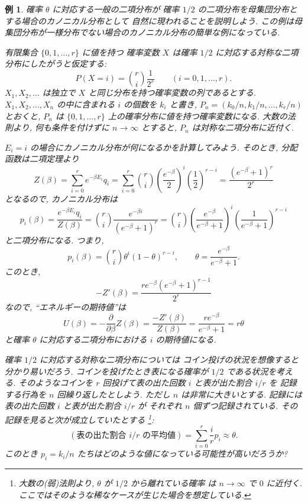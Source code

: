 \documentclass[12pt,twoside]{jarticle}
\renewcommand\d{\partial}
\theoremstyle{jplain}
\newtheorem{example}[theorem]{例}
\theoremstyle{jplain}
\theoremstyle{jplain}
\numberwithin{theorem}{section}
\numberwithin{equation}{section}
\numberwithin{figure}{section}
\numberwithin{table}{section}
\begin{document}
\begin{example}
\label{example:binom-Gibbs}
確率 $\theta$ に対応する一般の二項分布が
確率 $1/2$ の二項分布を母集団分布とする場合のカノニカル分布として
自然に現われることを説明しよう.
この例は母集団分布が一様分布でない場合のカノニカル分布の簡単な例になっている.

有限集合 $\{0,1,\ldots,r\}$ に値を持つ
確率変数 $X$ は確率 $1/2$ に対応する対称な二項分布にしたがうと仮定する:
\[
P(X=i)=\binom{r}{i}\frac{1}{2^r}
\qquad (i=0,1,\ldots,r).
\]
$X_1,X_2,\ldots$ は独立で $X$ と同じ分布を持つ確率変数の列であるとする.
$X_1,X_2,\ldots,X_n$ の中に含まれる $i$ の個数を $k_i$ と書き,
$P_n=(k_0/n,k_1/n,\ldots,k_r/n)$ とおくと,
$P_n$ は $\{0,1,\ldots,r\}$ 上の確率分布に値を持つ確率変数になる.
大数の法則より, 何も条件を付けずに $n\to\infty$ とすると,
$P_n$ は対称な二項分布に近付く.

$E_i=i$ の場合にカノニカル分布が何になるかを計算してみよう.
そのとき, 分配函数は二項定理より
\[
Z(\beta)
=\sum_{i=0}^r e^{-\beta E_i}q_i
=\sum_{i=0}^r \binom{r}{i}\left(\frac{e^{-\beta}}{2}\right)^i\left(\frac{1}{2}\right)^{r-i}
=\frac{(e^{-\beta}+1)^r}{2^r}
\]
となるので, カノニカル分布は
\[
p_i(\beta)
=\frac{e^{-\beta E_i}q_i}{Z(\beta)}
=\binom{r}{i}\frac{e^{-\beta i}}{(e^{-\beta}+1)^r}
=\binom{r}{i}
\left(\frac{e^{-\beta}}{e^{-\beta}+1}\right)^i
\left(\frac{1}{e^{-\beta}+1}\right)^{r-i}
\]
と二項分布になる. つまり,
\[
p_i(\beta)=\binom{r}{i}\theta^i(1-\theta)^{r-i},
\qquad
\theta=\frac{e^{-\beta}}{e^{-\beta}+1}.
\]
このとき,
\[
-Z'(\beta)=\frac{r e^{-\beta}(e^{-\beta}+1)^{r-1}}{2^r}
\]
なので, ``エネルギーの期待値''は
\[
U(\beta)
=-\frac{\d}{\d\beta}Z(\beta)
=\frac{-Z'(\beta)}{Z(\beta)}
=\frac{r e^{-\beta}}{e^{-\beta}+1}
=r\theta
\]
と確率 $\theta$ に対応する二項分布における $i$ の期待値になる.

確率 $1/2$ に対応する対称な二項分布については
コイン投げの状況を想像すると分かり易いだろう.
コインを投げたとき表になる確率が $1/2$ である状況を考える.
そのようなコインを $r$ 回投げて表の出た回数 $i$ と表が出た割合 $i/r$ を
記録する行為を $n$ 回繰り返したとしよう.
ただし $n$ は非常に大きいとする.
記録には表の出た回数 $i$ と表が出た割合 $i/r$ が
それぞれ $n$ 個ずつ記録されている.
その記録を見ると次が成立していたとする%
\footnote{大数の(弱)法則より, $\theta$ が $1/2$ から離れている確率
は $n\to\infty$ で $0$ に近付く.
ここではそのような稀なケースが生じた場合を想定している.}:
\[
(\text{表の出た割合 $i/r$ の平均値})
=\sum_{i=0}^r \frac{i}{r} p_i
\approx \theta.
\tag{$*$}
\]
このとき $p_i=k_i/n$ たちはどのような値になっている可能性が高いだろうか?


\end{example}
\end{document}
